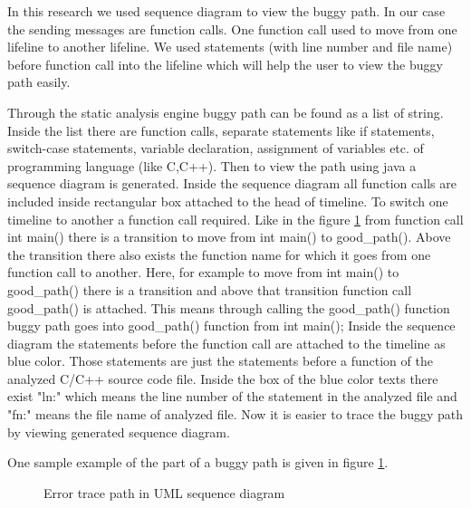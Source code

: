 In this research we used sequence diagram to view the buggy path. In our case the sending messages are function calls. One function call used to move from one lifeline to another lifeline. We used statements (with line number and file name) before function call into the lifeline which will help the user to view the buggy path easily.

Through the static analysis engine buggy path can be found as a list of string. Inside the list there are function calls, separate statements like if statements, switch-case statements, variable declaration, assignment of variables etc. of programming language (like C,C++). Then to view the path using java a sequence diagram is generated. Inside the sequence diagram all function calls are included inside rectangular box attached to the head of timeline. To switch one timeline to another a function call required. Like in the figure \ref{Error_trace_path} from function call int main() there is a transition to move from int main() to good\_path(). Above the transition there also exists the function name for which it goes from one function call to another. Here, for example to move from int main() to good\_path() there is a transition and above that transition function call good\_path() is attached. This means through calling the good\_path() function buggy path goes into good\_path() function from int main(); Inside the sequence diagram the statements before the function call are attached to the timeline as blue color. Those statements are just the statements before a function of the analyzed C/C++ source code file. Inside the box of the blue color texts there exist "ln:" which means the line number of the statement in the analyzed file and "fn:" means the file name of analyzed file. Now it is easier to trace the buggy path by viewing generated sequence diagram.

 One sample example of the part of a buggy path is given in figure \ref{Error_trace_path}.
\begin{figure}[htbp]
	\centering
	\label{Error_trace_path}
	\caption{Error trace path in UML sequence diagram}
\end{figure}

